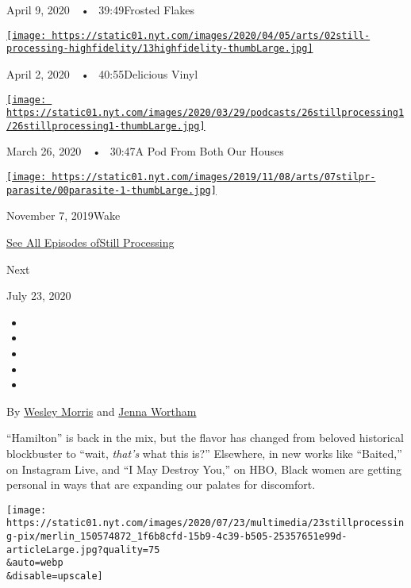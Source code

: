 April 9, 2020~~•~ 39:49Frosted Flakes

\href{https://www.nytimes.com/2020/04/02/podcasts/high-fidelity-zoe-kravitz.html?action=click\&module=audio-series-bar\&region=header\&pgtype=Article}{\texttt{[image: https://static01.nyt.com/images/2020/04/05/arts/02still-processing-highfidelity/13highfidelity-thumbLarge.jpg]}}

April 2, 2020~~•~ 40:55Delicious Vinyl

\href{https://www.nytimes.com/2020/03/26/podcasts/still-processing-quarantine.html?action=click\&module=audio-series-bar\&region=header\&pgtype=Article}{\texttt{[image: https://static01.nyt.com/images/2020/03/29/podcasts/26stillprocessing1/26stillprocessing1-thumbLarge.jpg]}}

March 26, 2020~~•~ 30:47A Pod From Both Our Houses

\href{https://www.nytimes.com/2019/11/07/podcasts/still-processing-parasite-watchmen-bong-joon-ho.html?action=click\&module=audio-series-bar\&region=header\&pgtype=Article}{\texttt{[image: https://static01.nyt.com/images/2019/11/08/arts/07stilpr-parasite/00parasite-1-thumbLarge.jpg]}}

November 7, 2019Wake

\href{https://www.nytimes.com/column/still-processing-podcast}{See All
Episodes ofStill Processing}

Next

July 23, 2020

\begin{itemize}
\item
\item
\item
\item
\item
\end{itemize}

By \href{https://www.nytimes.com/by/wesley-morris}{Wesley Morris} and
\href{https://www.nytimes.com/by/jenna-wortham}{Jenna Wortham}

``Hamilton'' is back in the mix, but the flavor has changed from beloved
historical blockbuster to ``wait, \emph{that's} what this is?''
Elsewhere, in new works like ``Baited,'' on Instagram Live, and ``I May
Destroy You,'' on HBO, Black women are getting personal in ways that are
expanding our palates for discomfort.

\texttt{[image: https://static01.nyt.com/images/2020/07/23/multimedia/23stillprocessing-pix/merlin\_150574872\_1f6b8cfd-15b9-4c39-b505-25357651e99d-articleLarge.jpg?quality=75\\\&auto=webp\\\&disable=upscale]}

